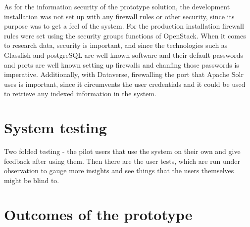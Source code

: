 As for the information security of the prototype solution, the development
installation was not set up with any firewall rules or other security, since
its purpose was to get a feel of the system. For the production installation
firewall rules were set using the security groups functions of OpenStack.
When it comes to research data, security is important, and since the
technologies such as Glassfish and postgreSQL are well known software and
their default passwords and ports are well known setting up firewalls and
chanfing those passwords is imperative. Additionally, with Dataverse,
firewalling the port that Apache Solr uses is important, since it circumvents
the user credentials and it could be used to retrieve any indexed information
in the system.

\section{System testing}
\label{sec:system_testing}

Two folded testing - the pilot users that use the system on their own and give
feedback after using them. Then there are the user tests, which are run under
observation to gauge more insights and see things that the users themselves
might be blind to.

\section{Outcomes of the prototype}
\label{sec:prototype_outcomes}

